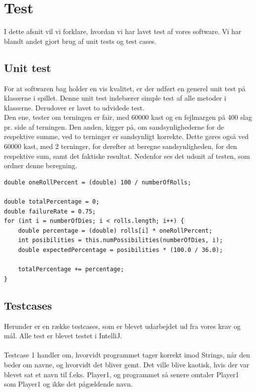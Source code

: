 \chapter{Test}

I dette afsnit vil vi forklare, hvordan vi har lavet test af vores software.
Vi har blandt andet gjort brug af unit tests og test cases.

\section{Unit test}

For at softwaren bag holder en vis kvalitet, er der udført en generel unit test på klasserne i spillet.
Denne unit test indebærer simple test af alle metoder i klasserne.
Derudover er lavet to udvidede test.
\\
Den ene, tester om terningen er fair, med 60000 kast og en fejlmargen på 400 slag pr. side af terningen.
Den anden, kigger på, om sandsynlighederne for de respektive summe, ved to terninger er sandsynligt korrekte.
Dette gøres også ved 60000 kast, med 2 terninger, for derefter at beregne sandsynligheden, for den respektive sum, samt det faktiske resultat.
Nedenfor ses det udsnit af testen, som ordner denne beregning.
\\

\begin{lstlisting}
double oneRollPercent = (double) 100 / numberOfRolls;
    
double totalPercentage = 0;
double failureRate = 0.75;
for (int i = numberOfDies; i < rolls.length; i++) {
    double percentage = (double) rolls[i] * oneRollPercent;
    int posibilities = this.numPossibilities(numberOfDies, i);
    double expectedPercentage = posibilities * (100.0 / 36.0);

    totalPercentage += percentage;
}
\end{lstlisting}

\newpage

\section{Testcases}
Herunder er en række testcases, som er blevet udarbejdet ud fra vores krav og mål.
Alle test er blevet testet i IntelliJ.
\\
\\
Testcase 1 handler om, hvorvidt programmet tager korrekt imod Strings, når den beder om navne, og hvorvidt det bliver gemt.
Det ville blive kaotisk, hvis der var blevet sat et navn til f.eks. Player1, og programmet så senere omtaler Player1 som Player1 og ikke det pågældende navn.

